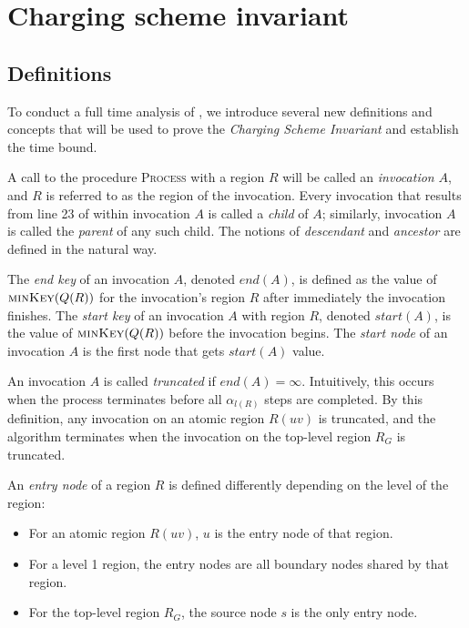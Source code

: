 \section{Charging scheme invariant}

\subsection{Definitions}
To conduct a full time analysis of , we introduce several new definitions and concepts that will be used to prove the \emph{Charging Scheme Invariant} and establish the time bound.

A call to the procedure \textsc{Process} with a region $R$ will be called an \emph{invocation} $A$, and $R$ is referred to as the region of the invocation. Every invocation that results from line 23 of  within invocation $A$ is called a \emph{child} of $A$; similarly, invocation $A$ is called the \emph{parent} of any such child. The notions of \emph{descendant} and \emph{ancestor} are defined in the natural way.

The \emph{end key} of an invocation $A$, denoted $end(A)$, is defined as the value of $\textsc{minKey}(Q(R))$ for the invocation's region $R$ after immediately the invocation finishes. The \emph{start key} of an invocation $A$ with region $R$, denoted $start(A)$, is the value of $\textsc{minKey}(Q(R))$ before the invocation begins. The \emph{start node} of an invocation $A$ is the first node that gets $start(A)$ value.

An invocation $A$ is called \emph{truncated} if $end(A) = \infty$. Intuitively, this occurs when the process terminates before all $\alpha_{l(R)}$ steps are completed. By this definition, any invocation on an atomic region $R(u v)$ is truncated, and the algorithm terminates when the invocation on the top-level region $R_G$ is truncated. 

\begin{defn}
An \emph{entry node} of a region $R$ is defined differently depending on the level of the region:
\begin{itemize}
    \item For an atomic region $R(u v)$, $u$ is the entry node of that region.
    \item For a level 1 region, the entry nodes are all boundary nodes shared by that region.
    \item For the top-level region $R_G$, the source node $s$ is the only entry node.
\end{itemize}
\end{defn}

